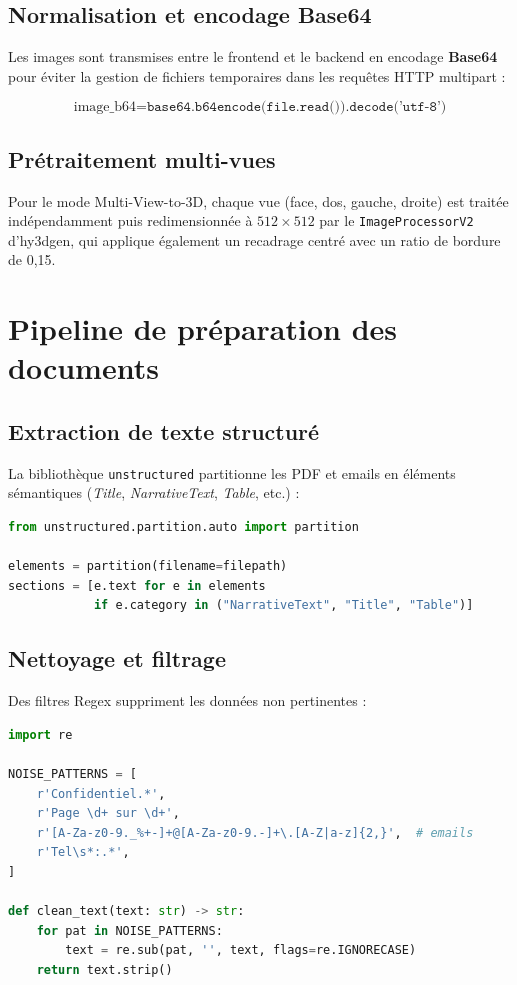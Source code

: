 \documentclass[12pt,a4paper,oneside]{report}
\begin{document}
\subsection{Normalisation et encodage Base64}
Les images sont transmises entre le frontend et le backend en encodage
\textbf{Base64} pour éviter la gestion de fichiers temporaires dans
les requêtes HTTP multipart :

\begin{equation}
\text{image\_b64} = \texttt{base64.b64encode(file.read()).decode('utf-8')}
\label{eq:b64}
\end{equation}

\subsection{Prétraitement multi-vues}
Pour le mode Multi-View-to-3D, chaque vue (face, dos, gauche, droite) est
traitée indépendamment puis redimensionnée à $512\times512$ par le
\texttt{ImageProcessorV2} d'hy3dgen, qui applique également un recadrage
centré avec un ratio de bordure de 0,15.

\section{Pipeline de préparation des documents}

\subsection{Extraction de texte structuré}
La bibliothèque \texttt{unstructured} partitionne les PDF et emails en
éléments sémantiques (\textit{Title}, \textit{NarrativeText},
\textit{Table}, etc.) :

\begin{lstlisting}[language=Python,
  caption={Extraction de documents dans document\_parser.py}]
from unstructured.partition.auto import partition

elements = partition(filename=filepath)
sections = [e.text for e in elements
            if e.category in ("NarrativeText", "Title", "Table")]
\end{lstlisting}

\subsection{Nettoyage et filtrage}
Des filtres Regex suppriment les données non pertinentes :

\begin{lstlisting}[language=Python,
  caption={Filtres de nettoyage du texte}]
import re

NOISE_PATTERNS = [
    r'Confidentiel.*',
    r'Page \d+ sur \d+',
    r'[A-Za-z0-9._%+-]+@[A-Za-z0-9.-]+\.[A-Z|a-z]{2,}',  # emails
    r'Tel\s*:.*',
]

def clean_text(text: str) -> str:
    for pat in NOISE_PATTERNS:
        text = re.sub(pat, '', text, flags=re.IGNORECASE)
    return text.strip()
\end{lstlisting}
\end{document}
